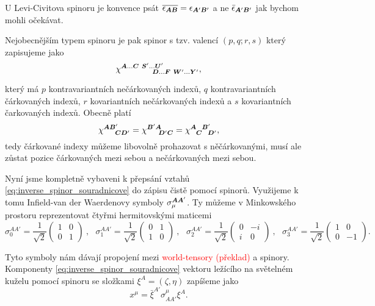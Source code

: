 U Levi-Civitova spinoru je konvence psát $\overline{\epsilon_{{\boldsymbol{A}}{\boldsymbol{B}}}} = \epsilon_{{\boldsymbol{A}}'{\boldsymbol{B}}'}$ a ne 
$\bar{\epsilon}_{{\boldsymbol{A}}'{\boldsymbol{B}}'}$ jak bychom mohli očekávat.

Nejobecnějším typem spinoru je pak spinor s tzv. valencí $(p, q; r, s)$ který zapisujeme jako
\begin{equation}
    \chi^{{\boldsymbol{A}}\dots {\boldsymbol{C}} ~\boldsymbol{S}'\dots \boldsymbol{U}'}_{~~~~~~~~~~~{\boldsymbol{D}}\dots \boldsymbol{F}~ \boldsymbol{W}'\dots \boldsymbol{Y}'},
\end{equation}

který má $p$ kontravariantních nečárkovaných indexů, $q$ kontravariantních čárkovaných indexů, $r$
kovariantních nečárkovaných indexů a $s$ kovariantních čarkovaných indexů. Obecně platí
\begin{equation}
    \chi^{{\boldsymbol{A}}{\boldsymbol{B}}'}_{~~~~{\boldsymbol{C}}{\boldsymbol{D}}'} = \chi^{{\boldsymbol{B}}'{\boldsymbol{A}}}_{~~~~{\boldsymbol{D}}'{\boldsymbol{C}}} = \chi^{{\boldsymbol{A}}~~{\boldsymbol{B}}'}_{~~{\boldsymbol{C}}~~{\boldsymbol{D}}'},
\end{equation}
tedy čárkované indexy můžeme libovolně prohazovat s něčárkovanými, musí ale zůstat pozice čárkovaných mezi sebou
a nečárkovaných mezi sebou.

Nyní jsme kompletně vybaveni k přepsání vztahů \ref{eq:inverse_spinor_souradnicove} do zápisu čistě pomocí spinorů.
Využijeme k tomu Infield-van der Waerdenovy symboly $\sigma_\mu^{{\boldsymbol{A}}{\boldsymbol{A}}'}$. Ty můžeme v Minkowského prostoru reprezentovat
čtyřmi hermitovskými maticemi
\begin{equation} \scriptstyle
    \sigma_0^{AA'}=\frac{1}{\sqrt{2}}\left(\begin{smallmatrix}
        1 & 0 \\
        0 & 1
    \end{smallmatrix}\right)~,~~~ \sigma_1^{AA'}=\frac{1}{\sqrt{2}}\left(\begin{smallmatrix}
        0 & 1 \\
        1 & 0
    \end{smallmatrix}\right)~,~~~ \sigma_2^{AA'}=\frac{1}{\sqrt{2}}\left(\begin{smallmatrix}
        0 & -i \\
        i & 0
    \end{smallmatrix}\right)~,~~~ \sigma_3^{AA'}=\frac{1}{\sqrt{2}}\left(\begin{smallmatrix}
        1 & 0 \\
        0 & -1
    \end{smallmatrix}\right).
\end{equation}

Tyto symboly nám dávají propojení mezi \textcolor{red}{world-tensory (překlad)} a spinory. Komponenty
\ref{eq:inverse_spinor_souradnicove} vektoru ležícího na světelném kuželu pomocí spinoru se
složkami $\xi^A=(\zeta, \eta)$ zapíšeme jako
\begin{equation}
    x^\mu = \bar{\xi}^{A'} \sigma_{AA'}^\mu \xi^A.
\end{equation}

